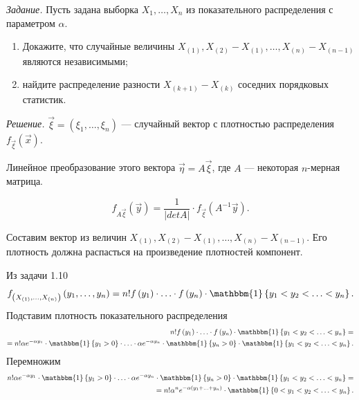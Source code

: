 \textit{Задание.}
Пусть задана выборка $X_1, \dotsc, X_n$ из показательного распределения с параметром $ \alpha $.
\begin{enumerate}[label=\alph*)]
  \item Докажите,
  что случайные величины
  $X_{ \left( 1 \right) },
    X_{ \left( 2 \right) } - X_{ \left( 1 \right) },
    \dotsc,
    X_{ \left( n \right) } - X_{ \left( n - 1 \right) }$
  являются независимыми;
  \item найдите распределение разности $X_{ \left( k + 1 \right) } - X_{ \left( k \right) }$
  соседних порядковых статистик.
\end{enumerate}

\textit{Решение.}
$ \vec{ \xi } = \left( \xi_1, \dotsc, \xi_n \right) $ ---
случайный вектор с плотностью распределения $f_{ \vec{ \xi }} \left( \vec{x} \right) $.

Линейное преобразование этого вектора $ \vec{ \eta } = A \vec{ \xi }$, где $A$ ---
некоторая $n$-мерная матрица.

$$f_{A \vec{ \xi }} \left( \vec{y} \right) =
  \frac{1}{ \left| detA \right| } \cdot f_{ \vec{ \xi }} \left( A^{-1} \vec{y} \right).$$

Составим вектор из величин
$X_{ \left( 1 \right) },
  X_{ \left( 2 \right) } - X_{ \left( 1 \right) },
  \dotsc,
  X_{ \left( n \right) } - X_{ \left( n - 1 \right) }$.
Его плотность должна распасться на произведение плотностей компонент.

Из задачи 1.10
$$f_{ \left( X_{ \left( 1 \right) }, \dotsc, X_{ \left( n \right) } \right) }
  \left( y_1, \dotsc, y_n \right) =
  n! f \left( y_1 \right) \cdot \dotsc \cdot f \left( y_n \right) \cdot
  \mathbbm{1} \left\{y_1 < y_2 < \dotsc < y_n \right\}.$$
Подставим плотность показательного распределения
\begin{equation*}
  \begin{split}
    n! f \left( y_1 \right) \cdot \dotsc \cdot f \left( y_n \right) \cdot
    \mathbbm{1} \left\{y_1 < y_2 < \dotsc < y_n \right\} = \\
    = n! \alpha e^{- \alpha y_1} \cdot \mathbbm{1} \left\{ y_1 > 0 \right\} \cdot \dotsc \cdot
    \alpha e^{- \alpha y_n} \cdot \mathbbm{1} \left\{ y_n > 0 \right\} \cdot
    \mathbbm{1} \left\{ y_1 < y_2 < \dotsc < y_n \right\}.
  \end{split}
\end{equation*}
Перемножим
\begin{equation*}
  \begin{split}
    n! \alpha e^{- \alpha y_1} \cdot \mathbbm{1} \left\{ y_1 > 0 \right\} \cdot \dotsc \cdot
    \alpha e^{- \alpha y_n} \cdot \mathbbm{1} \left\{ y_n > 0 \right\} \cdot
    \mathbbm{1} \left\{ y_1 < y_2 < \dotsc < y_n \right\} = \\
    = n! \alpha^n e^{- \alpha \left( y_1 + \dotsc + y_n \right) } \cdot
    \mathbbm{1} \left\{ 0 < y_1 < y_2 < \dotsc < y_n \right\}.
  \end{split}
\end{equation*}

